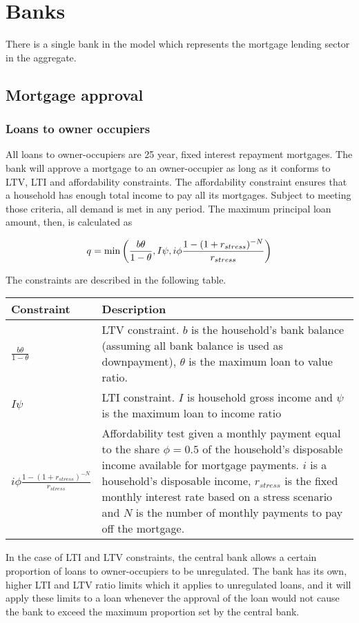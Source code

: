 \documentclass{report}
\begin{document}
\section{Banks}

There is a single bank in the model which represents the mortgage lending
sector in the aggregate.

\subsection{Mortgage approval}
\subsubsection{Loans to owner occupiers}
All loans to owner-occupiers are 25 year, fixed interest repayment mortgages. The bank will approve a mortgage to an owner-occupier as long as it conforms to LTV, LTI and affordability constraints. The affordability
constraint ensures that a household has enough total income to pay all its
mortgages. Subject to meeting those criteria, all demand is met in any
period. The maximum principal loan amount, then, is calculated as

\bigskip 
\begin{equation}
q=\min \left( \frac{b\theta}{1-\theta},I \psi ,i\phi\frac{%
1-(1+r_{stress})^{-N}}{r_{stress}}\right)
\end{equation}

The constraints are described in the following table.

\begin{tabular}{p{1in}|p{3.5in}}
Constraint & Description \\ \hline\hline
$\frac{b\theta}{1-\theta}$ & LTV constraint. $b$ is the household's bank
balance (assuming all bank balance is used as downpayment), $\theta$ is the maximum loan to value ratio. \\ 
$I\psi $ & LTI constraint. $I$ is household gross income and $\psi $ is
the maximum loan to income ratio \\ 
$i\phi\frac{1-(1+r_{stress})^{-N}}{r_{stress}}$ & Affordability test
given a monthly payment equal to
the share $\phi=0.5$ of the household's disposable income available for
mortgage payments. $i$ is a household's disposable income, $r_{stress}$ is the fixed monthly interest rate based on
a stress scenario and $N$ is the number of monthly payments to pay off the
mortgage.
\end{tabular}

In the case of LTI and LTV constraints, the central bank allows a certain proportion of loans to owner-occupiers to be unregulated. The bank has its own, higher LTI and LTV ratio limits which it applies to unregulated loans, and it will apply these limits to a loan whenever the approval of the loan would not cause the bank to exceed the maximum proportion set by the central bank.
\end{document}
